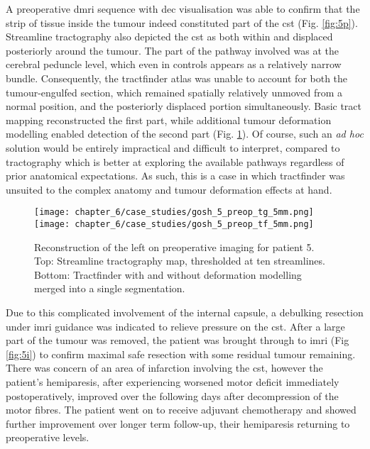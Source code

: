 A preoperative \gls{dmri} sequence with \gls{dec} visualisation was able to confirm that the strip of tissue inside the tumour indeed constituted part of the \gls{cst} (Fig. \ref{fig:5p}).
Streamline tractography also depicted the \gls{cst} as both within and displaced posteriorly around the tumour.
The part of the pathway involved was at the cerebral peduncle level, which even in controls appears as a relatively narrow bundle.
Consequently, the tractfinder atlas was unable to account for both the tumour-engulfed section, which remained spatially relatively unmoved from a normal position, and the posteriorly displaced portion simultaneously.
Basic tract mapping reconstructed the first part, while additional tumour deformation modelling enabled detection of the second part (Fig. \ref{fig:5p_cst}).
Of course, such an \textit{ad hoc} solution would be entirely impractical and difficult to interpret, compared to tractography which is better at exploring the available pathways regardless of prior anatomical expectations.
As such, this is a case in which tractfinder was unsuited to the complex anatomy and tumour deformation effects at hand.

\begin{figure}[htb!]
  \centering
  \texttt{[image: chapter\_6/case\_studies/gosh\_5\_preop\_tg\_5mm.png]}
  \texttt{[image: chapter\_6/case\_studies/gosh\_5\_preop\_tf\_5mm.png]}
  \caption[GOSH iMRI patient 5, preoperative imaging, corticospinal tract reconstruction]{Reconstruction of the left  on preoperative imaging for patient 5. Top: Streamline tractography  map, thresholded at ten streamlines. Bottom: Tractfinder with and without deformation modelling merged into a single segmentation.}
  \label{fig:5p_cst}
\end{figure}

Due to this complicated involvement of the internal capsule, a debulking resection under \gls{imri} guidance was indicated to relieve pressure on the \gls{cst}.
After a large part of the tumour was removed, the patient was brought through to \gls{imri} (Fig \ref{fig:5i}) to confirm maximal safe resection with some residual tumour remaining.
There was concern of an area of infarction involving the \gls{cst}, however the patient's hemiparesis, after experiencing worsened motor deficit immediately postoperatively, improved over the following days after decompression of the motor fibres.
The patient went on to receive adjuvant chemotherapy and showed further improvement over longer term follow-up, their hemiparesis returning to preoperative levels.

